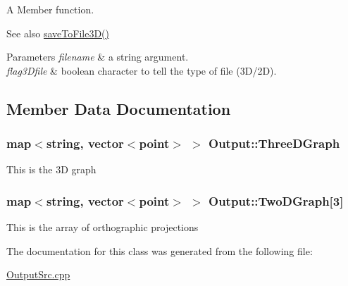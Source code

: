 A Member function. 

\begin{DoxySeeAlso}{See also}
\hyperlink{classOutput_aa16a2893d743f7c218c026efa3e65718}{save\+To\+File3\+D()} 
\end{DoxySeeAlso}

\begin{DoxyParams}{Parameters}
{\em filename} & a string argument. \\
\hline
{\em flag3\+Dfile} & boolean character to tell the type of file (3\+D/2D). \\
\hline
\end{DoxyParams}


\subsection{Member Data Documentation}
\subsubsection[{\texorpdfstring{Three\+D\+Graph}{ThreeDGraph}}]{\setlength{\rightskip}{0pt plus 5cm}map$<$string, vector$<${\bf point}$>$ $>$ Output\+::\+Three\+D\+Graph}\hypertarget{classOutput_aae5a299ccc1830950c8e03cfe7863a4f}{}\label{classOutput_aae5a299ccc1830950c8e03cfe7863a4f}
This is the 3D graph 
\subsubsection[{\texorpdfstring{Two\+D\+Graph}{TwoDGraph}}]{\setlength{\rightskip}{0pt plus 5cm}map$<$string, vector$<${\bf point}$>$ $>$ Output\+::\+Two\+D\+Graph\mbox{[}3\mbox{]}}\hypertarget{classOutput_a24397893b0741447fdc351e5f66c2bfc}{}\label{classOutput_a24397893b0741447fdc351e5f66c2bfc}
This is the array of orthographic projections 

The documentation for this class was generated from the following file\+:\begin{DoxyCompactItemize}
\item 
\hyperlink{OutputSrc_8cpp}{Output\+Src.\+cpp}\end{DoxyCompactItemize}
